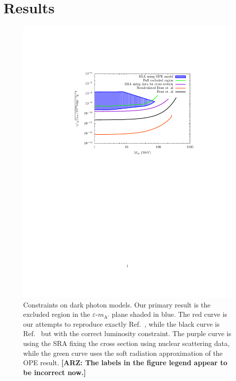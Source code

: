 \documentclass[nofootinbib,prd,superscriptaddress,twocolumn]{revtex4}
\newcommand{\arz}[1]{{{\bf{\color{BrickRed}[ARZ: #1]}}}}
\begin{document}
\section{Results}
\label{section:results}



\begin{figure}[th]
\includegraphics[width=14cm]{compiledbounds_edited.pdf}
\caption{
Constraints on dark photon models. Our primary result is the excluded region 
in the $\varepsilon$-$m_{\mathrm{A'}}$ plane shaded in blue. The red curve is our attempts to reproduce exactly Ref.~\cite{dent_etal12}, while the black curve is Ref.~\cite{dent_etal12} but with the correct luminosity constraint.  The purple curve is using the SRA fixing the cross section using nuclear scattering data, while the green curve uses the soft radiation approximation of the OPE result.  \arz{The labels in the figure legend appear to be incorrect now.}
}
\label{fig:constraint}
\end{figure}
\end{document}
